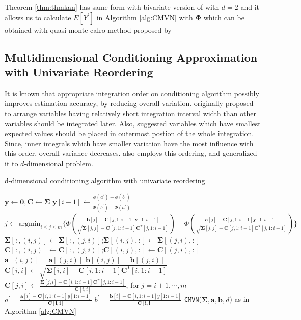 Theorem \ref{thm:thmkan} has same form with bivariate version of \citet{trinh2015bivariate} with $d=2$ and it allows us to calculate $E[Y^\prime]$ in Algorithm \ref{alg:CMVN} with $\boldsymbol{\Phi}$ which can be obtained with quasi monte calro method proposed by \citet{genz1992numerical}

\subsection{Multidimensional Conditioning Approximation with Univariate Reordering}
It is known that appropriate integration order on conditioning algorithm possibly improves estimation accuracy, by reducing overall variation. \citet{schervish1984algorithm} originally proposed to arrange variables having relatively short integration interval width than other variables should be integrated later. Also, \citet{gibson1994monte} suggested variables which have smallest expected values should be placed in outermost postion of the whole integration. Since, inner integrals which have smaller variation have the most influence with this order, overall variance decreases.
\citet{trinh2015bivariate} also employs this ordering, and \citet{cao2019hierarchical} generalized it to $d$-dimensional problem.
\begin{algorithm}[ht]
	\caption{d-dimensional conditioning algorithm with univariate reordering}
	\begin{algorithmic}[1]
		\State $\mathbf{y}\leftarrow\mathbf{0},\mathbf{C}\leftarrow\boldsymbol{\Sigma}$
		\State $\mathbf{y}[i-1]\leftarrow\frac{\phi(a^\prime)-\phi(b^\prime)}{\Phi(b^\prime)-\Phi(a^\prime)}$
		\EndIf
		\State $j\leftarrow\text{argmin}_{i\leq j\leq m}\{\Phi(\frac{\mathbf{b}[j]-\mathbf{C}[j,1:i-1]\mathbf{y}[1:i-1]}{\sqrt{\boldsymbol{\Sigma}[j,j]-\mathbf{C}[j,1:i-1]\mathbf{C}^T[j,1:i-1]}})-\Phi(\frac{\mathbf{a}[j]-\mathbf{C}[j,1:i-1]\mathbf{y}[1:i-1]}{\sqrt{\boldsymbol{\Sigma}[j,j]-\mathbf{C}[j,1:i-1]\mathbf{C}^T[j,1:i-1]}})\}$
		\State $\boldsymbol{\Sigma}[:,(i,j)]\leftarrow\boldsymbol{\Sigma}[:,(j,i)]$;$\boldsymbol{\Sigma}[(i,j),:]\leftarrow\boldsymbol{\Sigma}[(j,i),:]$
		\State $\mathbf{C}[:,(i,j)]\leftarrow\mathbf{C}[:,(j,i)]$;$\mathbf{C}[(i,j),:]\leftarrow\mathbf{C}[(j,i),:]$
		\State $\mathbf{a}[(i,j)]=\mathbf{a}[(j,i)]$
		\State $\mathbf{b}[(i,j)]=\mathbf{b}[(j,i)]$
		\State $\mathbf{C}[i,i]\leftarrow\sqrt{\boldsymbol{\Sigma}[i,i]-\mathbf{C}[i,1:i-1]\mathbf{C}^T[i,1:i-1]}$
		\State $\mathbf{C}[j,i]\leftarrow \frac{\boldsymbol{\Sigma}[j,i]-\mathbf{C}[i,1:i-1]\mathbf{C}^T[j,1:i-1]}{\mathbf{C}[i,i]}$, for $j=i+1,\cdots,m$
		\State $a^\prime=\frac{\mathbf{a}[i]-\mathbf{C}[i,1:i-1]y[1:i-1]}{\mathbf{C[i,i]}}$
		\State $b^\prime=\frac{\mathbf{b}[i]-\mathbf{C}[i,1:i-1]y[1:i-1]}{\mathbf{C[i,i]}}$
		\EndFor
		\State\Return \texttt{CMVN}($\boldsymbol{\Sigma},\mathbf{a},\mathbf{b},d$) as in Algorithm \ref{alg:CMVN}
		\EndProcedure
	\end{algorithmic}\label{alg:RCMVN}
\end{algorithm}
